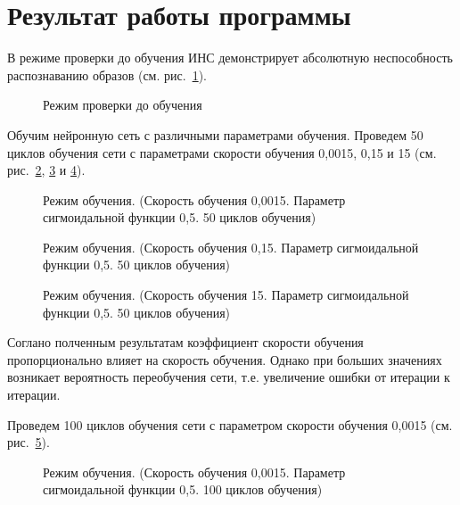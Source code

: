\section{Результат работы программы}


В режиме проверки  до обучения ИНС демонстрирует абсолютную неспособность распознаванию образов (см. рис.~\ref{ris:Check}).

\begin{figure}[h]
\caption{Режим проверки до обучения}
\label{ris:Check}
\end{figure}

Обучим нейронную сеть с различными параметрами обучения.
Проведем 50 циклов обучения сети с параметрами скорости обучения 0,0015, 0,15 и 15 (см. рис.~\ref{ris:stud_0,0015_0,5_50}, \ref{ris:stud_0,15_0,5_50} и \ref{ris:stud_15_0,5_50}).

\begin{figure}[H]
\caption{Режим обучения. (Скорость обучения 0,0015. Параметр сигмоидальной функции 0,5. 50 циклов обучения)}
\label{ris:stud_0,0015_0,5_50}
\end{figure}

\begin{figure}[H]
\caption{Режим обучения. (Скорость обучения 0,15. Параметр сигмоидальной функции 0,5. 50 циклов обучения)}
\label{ris:stud_0,15_0,5_50}
\end{figure}

\begin{figure}[H]
\caption{Режим обучения. (Скорость обучения 15. Параметр сигмоидальной функции 0,5. 50 циклов обучения)}
\label{ris:stud_15_0,5_50}
\end{figure}

Соглано полченным результатам коэффициент скорости обучения пропорционально влияет на скорость обучения. 
Однако при больших значениях возникает вероятность переобучения сети, т.е. увеличение ошибки от итерации к итерации.


Проведем 100 циклов обучения сети с параметром скорости обучения 0,0015 (см. рис.~\ref{ris:stud_0,0015_0,5_100}).

\begin{figure}[h]
\caption{Режим обучения. (Скорость обучения 0,0015. Параметр сигмоидальной функции 0,5. 100 циклов обучения)}
\label{ris:stud_0,0015_0,5_100}
\end{figure}

